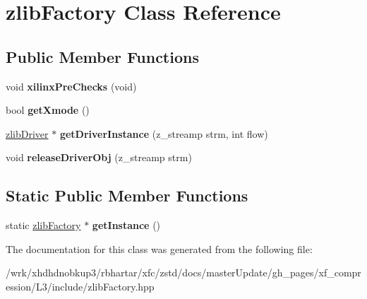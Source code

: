 \hypertarget{classzlibFactory}{\section{zlib\-Factory Class Reference}
\label{classzlibFactory}
}
\subsection*{Public Member Functions}
\begin{DoxyCompactItemize}
\item 
\hypertarget{classzlibFactory_a57eb82dce9977c01c69ead335663f496}{void {\bfseries xilinx\-Pre\-Checks} (void)}\label{classzlibFactory_a57eb82dce9977c01c69ead335663f496}

\item 
\hypertarget{classzlibFactory_add43e901446c41759c6fbd4a9f94273b}{bool {\bfseries get\-Xmode} ()}\label{classzlibFactory_add43e901446c41759c6fbd4a9f94273b}

\item 
\hypertarget{classzlibFactory_a1761aaa2a2d6cf84fe4ec24f4771e54a}{\hyperlink{classzlibDriver}{zlib\-Driver} $\ast$ {\bfseries get\-Driver\-Instance} (z\-\_\-streamp strm, int flow)}\label{classzlibFactory_a1761aaa2a2d6cf84fe4ec24f4771e54a}

\item 
\hypertarget{classzlibFactory_a140fe8ff09a3189de57e8f561ffe33c3}{void {\bfseries release\-Driver\-Obj} (z\-\_\-streamp strm)}\label{classzlibFactory_a140fe8ff09a3189de57e8f561ffe33c3}

\end{DoxyCompactItemize}
\subsection*{Static Public Member Functions}
\begin{DoxyCompactItemize}
\item 
\hypertarget{classzlibFactory_ae9af1e8b32ad709182e6df8c5184fabe}{static \hyperlink{classzlibFactory}{zlib\-Factory} $\ast$ {\bfseries get\-Instance} ()}\label{classzlibFactory_ae9af1e8b32ad709182e6df8c5184fabe}

\end{DoxyCompactItemize}


The documentation for this class was generated from the following file\-:\begin{DoxyCompactItemize}
\item 
/wrk/xhdhdnobkup3/rbhartar/xfc/zstd/docs/master\-Update/gh\-\_\-pages/xf\-\_\-compression/\-L3/include/zlib\-Factory.\-hpp\end{DoxyCompactItemize}

